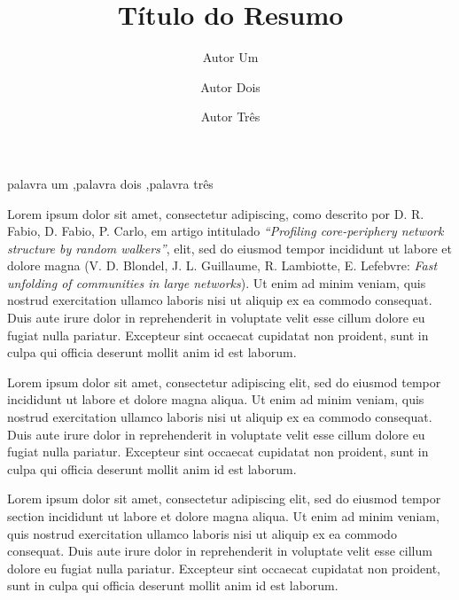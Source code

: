 \documentclass[12pt]{elsarticle}
\begin{document}
\begin{frontmatter}

\title{Título do Resumo}
\date{ }
\author[1,2,3]{Autor Um}
\author[2,*]{Autor Dois}
\author[1]{Autor Três}

\address[1]{Departamento de Computação, Grupo de Pesquisa, Rua do Saber, Cidade, Estado, Brasil}
\address[2]{Escola de Ciência, Universidade de Tecnologia, Rua do Conhecimento, 200, Cidade, Estado, Brasil}
\address[3]{Centro de Inteligência, Faculdade de Ciências, Rua do Jardim, s/n, Cidade, Estado, Brasil}

\address[*]{Autor para correspondência: email@myemail.com}

\begin{keyword}
palavra um \sep palavra dois \sep palavra três
\end{keyword}

\end{frontmatter}


Lorem ipsum dolor sit amet, consectetur adipiscing, como descrito por D. R. Fabio, D. Fabio, P. Carlo, em artigo intitulado \textit{``Profiling core-periphery network structure by random walkers''},   elit, sed do eiusmod tempor incididunt ut labore et dolore magna  (V. D. Blondel, J. L. Guillaume, R. Lambiotte, E. Lefebvre: \textit{Fast unfolding of communities in large networks}). Ut enim ad minim veniam, quis nostrud exercitation ullamco laboris nisi ut aliquip ex ea commodo consequat. Duis aute irure dolor in reprehenderit in voluptate velit esse cillum dolore eu fugiat nulla pariatur. Excepteur sint occaecat cupidatat non proident, sunt in culpa qui officia deserunt mollit anim id est laborum.

Lorem ipsum dolor sit amet, consectetur adipiscing elit, sed do eiusmod tempor incididunt ut labore et dolore magna aliqua. Ut enim ad minim veniam, quis nostrud exercitation ullamco laboris nisi ut aliquip ex ea commodo consequat. Duis aute irure dolor in reprehenderit in voluptate velit esse cillum dolore eu fugiat nulla pariatur. Excepteur sint occaecat cupidatat non proident, sunt in culpa qui officia deserunt mollit anim id est laborum.

Lorem ipsum dolor sit amet, consectetur adipiscing elit, sed do eiusmod tempor section incididunt ut labore et dolore magna aliqua. Ut enim ad minim veniam, quis nostrud exercitation ullamco laboris nisi ut aliquip ex ea commodo consequat. Duis aute irure dolor in reprehenderit in voluptate velit esse cillum dolore eu fugiat nulla pariatur. Excepteur sint occaecat cupidatat non proident, sunt in culpa qui officia deserunt mollit anim id est laborum.
\end{document}
